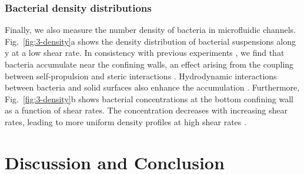 \subsubsection{Bacterial density distributions}
Finally, we also measure the number density of bacteria in microfluidic channels. Fig.~\ref{fig:3-density}a shows the density distribution of bacterial suspensions along y at a low shear rate. In consistency with previous experiments \cite{Hill2007, Berke2008, Li2009}, we find that bacteria accumulate near the confining walls, an effect arising from the coupling between self-propulsion and steric interactions \cite{Ezhilan2015}. Hydrodynamic interactions between bacteria and solid surfaces also enhance the accumulation \cite{Berke2008}. Furthermore, Fig.~\ref{fig:3-density}b shows bacterial concentrations at the bottom confining wall as a function of shear rates. The concentration decreases with increasing shear rates, leading to more uniform density profiles at high shear rates \cite{Ezhilan2015}.


\section{Discussion and Conclusion}
